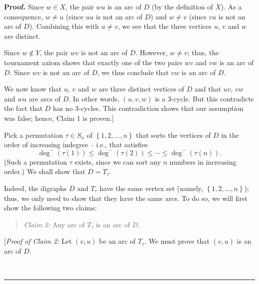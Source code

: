 \documentclass[numbers=enddot,12pt,final,onecolumn,notitlepage]{scrartcl}%
\numberwithin{exer}{subsection}
\theoremstyle{definition}
\newenvironment{statement}{\begin{quote}}{\end{quote}}
\newenvironment{proof}[1][Proof]{\noindent\textbf{#1.} }{\ \rule{0.5em}{0.5em}}
\begin{document}
\begin{proof}
Since $w\in X$, the pair $wu$ is an arc of $D$ (by the definition of $X$). As
a consequence, $w\neq u$ (since $uu$ is not an arc of $D$) and $w\neq v$
(since $vu$ is not an arc of $D$). Combining this with $u\neq v$, we see that
the three vertices $u$, $v$ and $w$ are distinct.

Since $w\notin Y$, the pair $wv$ is not an arc of $D$. However, $w\neq v$;
thus, the tournament axiom shows that exactly one of the two pairs $wv$ and
$vw$ is an arc of $D$. Since $wv$ is not an arc of $D$, we thus conclude that
$vw$ is an arc of $D$.

We now know that $u$, $v$ and $w$ are three distinct vertices of $D$ and that
$uv$, $vw$ and $wu$ are arcs of $D$. In other words, $\left(  u,v,w\right)  $
is a $3$-cycle. But this contradicts the fact that $D$ has no $3$-cycles. This
contradiction shows that our assumption was false; hence, Claim 1 is proven.]
\medskip

Pick a permutation $\tau\in S_{n}$ of $\left\{  1,2,\ldots,n\right\}  $ that
sorts the vertices of $D$ in the order of increasing indegree -- i.e., that
satisfies%
\begin{equation}
\deg^{-}\left(  \tau\left(  1\right)  \right)  \leq\deg^{-}\left(  \tau\left(
2\right)  \right)  \leq\cdots\leq\deg^{-}\left(  \tau\left(  n\right)
\right)  . \label{pf.thm.Tsig.props.b.chain}%
\end{equation}
(Such a permutation $\tau$ exists, since we can sort any $n$ numbers in
increasing order.) We shall show that $D=T_{\tau}$.

Indeed, the digraphs $D$ and $T_{\tau}$ have the same vertex set (namely,
$\left\{  1,2,\ldots,n\right\}  $); thus, we only need to show that they have
the same arcs. To do so, we will first show the following two claims:

\begin{statement}
\textit{Claim 2:} Any arc of $T_{\tau}$ is an arc of $D$.
\end{statement}

[\textit{Proof of Claim 2:} Let $\left(  v,u\right)  $ be an arc of $T_{\tau}%
$. We must prove that $\left(  v,u\right)  $ is an arc of $D$.


\end{proof}
\end{document}
